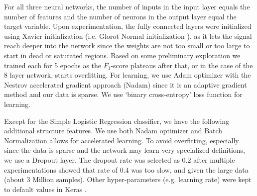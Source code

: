 \documentclass[runningheads,a4paper]{IEEEtran}
\begin{document}
For all three neural networks, the number of inputs in the input layer equals the number of features and the number of neurons in the output layer equal the target variable. Upon experimentation, the fully connected layers were initialized using Xavier initialization (i.e. Glorot Normal initialization \cite{glorot2010understanding}), as it lets the signal reach deeper into the network since the weights are not too small or too large to start in dead or saturated regions. Based on some preliminary exploration we trained each for 5 epochs as the $F_1$-score plateaus after that, or in the case of the 8 layer network, starts overfitting. For learning, we use Adam optimizer with the Nestrov accelerated gradient approach \cite{dozat2015incorporating} (Nadam) since it is an adaptive gradient method and our data is sparse. We use `binary cross-entropy' loss function for learning. 

Except for the Simple Logistic Regression classifier, we have the following additional structure features. We use both Nadam optimizer and Batch Normalization allows for accelerated learning. To avoid overfitting, especially since the data is sparse and the network may learn very specialized definitions, we use a Dropout layer. The dropout rate was selected as 0.2 after multiple experimentations showed that rate of 0.4 was too slow, and given the large data (about 3 Million samples). Other hyper-parameters (e.g. learning rate) were kept to default values in Keras \cite{chollet2015keras}.
\end{document}
